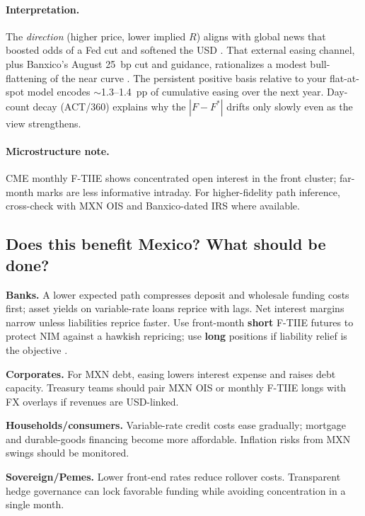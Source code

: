 \documentclass[11pt,a4paper]{article} %
\begin{document}
\paragraph{Interpretation.} The \emph{direction} (higher price, lower implied \(R\)) aligns with global news that boosted odds of a Fed cut and softened the USD \citep{reuters_global_cuts_sep11a,reuters_global_cuts_sep11b}. That external easing channel, plus Banxico’s August 25~bp cut and guidance, rationalizes a modest bull-flattening of the near curve \citep{reuters_banxico_cut_aug25,banxico_mps_aug7_2025}. The persistent positive basis relative to your flat-at-spot model encodes \(\sim\)1.3–1.4~pp of cumulative easing over the next year. Day-count decay (ACT/360) explains why the \(|F-F^{*}|\) drifts only slowly even as the view strengthens.

\paragraph{Microstructure note.} CME monthly F-TIIE shows concentrated open interest in the front cluster; far-month marks are less informative intraday. For higher-fidelity path inference, cross-check with MXN OIS and Banxico-dated IRS where available.

\subsection{Does this benefit Mexico? What should be done?}
\textbf{Banks.} A lower expected path compresses deposit and wholesale funding costs first; asset yields on variable-rate loans reprice with lags. Net interest margins narrow unless liabilities reprice faster. Use front-month \textbf{short} F-TIIE futures to protect NIM against a hawkish repricing; use \textbf{long} positions if liability relief is the objective \citep{cme_ftiie_article}.

\textbf{Corporates.} For MXN debt, easing lowers interest expense and raises debt capacity. Treasury teams should pair MXN OIS or monthly F-TIIE longs with FX overlays if revenues are USD-linked.

\textbf{Households/consumers.} Variable-rate credit costs ease gradually; mortgage and durable-goods financing become more affordable. Inflation risks from MXN swings should be monitored.

\textbf{Sovereign/Pemes.} Lower front-end rates reduce rollover costs. Transparent hedge governance can lock favorable funding while avoiding concentration in a single month.
\end{document}
